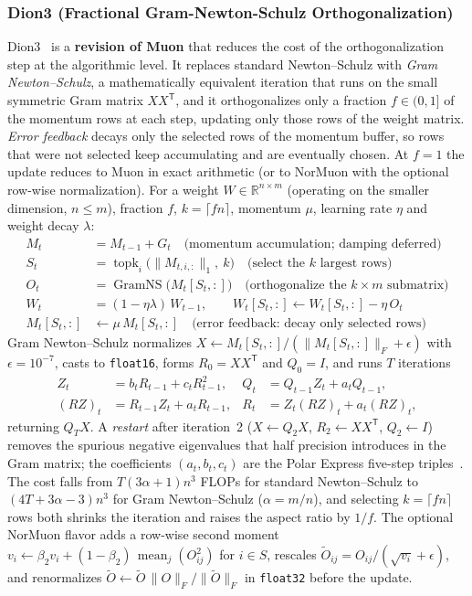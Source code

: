 \subsubsection{Dion3 (Fractional Gram-Newton-Schulz Orthogonalization)}
Dion3~\citep{amsel_dion3_2026} is a \textbf{revision of Muon} that reduces the cost of the orthogonalization step at the algorithmic level. It replaces standard Newton--Schulz with \emph{Gram Newton--Schulz}, a mathematically equivalent iteration that runs on the small symmetric Gram matrix $XX^{\mathsf T}$, and it orthogonalizes only a fraction $f \in (0,1]$ of the momentum rows at each step, updating only those rows of the weight matrix. \emph{Error feedback} decays only the selected rows of the momentum buffer, so rows that were not selected keep accumulating and are eventually chosen. At $f = 1$ the update reduces to Muon in exact arithmetic (or to NorMuon with the optional row-wise normalization). For a weight $W \in \mathbb{R}^{n \times m}$ (operating on the smaller dimension, $n \le m$), fraction $f$, $k = \lceil f n \rceil$, momentum $\mu$, learning rate $\eta$ and weight decay $\lambda$:
\begin{align}
M_t &= M_{t-1} + G_t \quad\text{(momentum accumulation; damping deferred)} \\
S_t &= \operatorname{topk}_{i}\bigl(\lVert M_{t,i,:}\rVert_1,\ k\bigr) \quad\text{(select the } k \text{ largest rows)} \\
O_t &= \operatorname{GramNS}\bigl(M_t[S_t,:]\bigr) \quad\text{(orthogonalize the } k \times m \text{ submatrix)} \\
W_t &= (1 - \eta\lambda)\, W_{t-1}, \qquad W_t[S_t,:] \gets W_t[S_t,:] - \eta\, O_t \\
M_t[S_t,:] &\gets \mu\, M_t[S_t,:] \quad\text{(error feedback: decay only selected rows)}
\end{align}
Gram Newton--Schulz normalizes $X \gets M_t[S_t,:]/(\lVert M_t[S_t,:]\rVert_F + \epsilon)$ with $\epsilon = 10^{-7}$, casts to \texttt{float16}, forms $R_0 = X X^{\mathsf T}$ and $Q_0 = I$, and runs $T$ iterations
\begin{align}
Z_t &= b_t R_{t-1} + c_t R_{t-1}^2, &
Q_t &= Q_{t-1} Z_t + a_t Q_{t-1}, \\
(RZ)_t &= R_{t-1} Z_t + a_t R_{t-1}, &
R_t &= Z_t (RZ)_t + a_t (RZ)_t,
\end{align}
returning $Q_T X$. A \emph{restart} after iteration~2 ($X \gets Q_2 X$, $R_2 \gets X X^{\mathsf T}$, $Q_2 \gets I$) removes the spurious negative eigenvalues that half precision introduces in the Gram matrix; the coefficients $(a_t,b_t,c_t)$ are the Polar Express five-step triples~\citep{amsel_polar_express_2026}. The cost falls from $T(3\alpha+1)n^3$ FLOPs for standard Newton--Schulz to $(4T+3\alpha-3)n^3$ for Gram Newton--Schulz ($\alpha = m/n$), and selecting $k = \lceil f n \rceil$ rows both shrinks the iteration and raises the aspect ratio by $1/f$. The optional NorMuon flavor adds a row-wise second moment $v_i \gets \beta_2 v_i + (1-\beta_2)\,\operatorname{mean}_j(O_{ij}^2)$ for $i \in S$, rescales $\tilde O_{ij} = O_{ij}/(\sqrt{v_i}+\epsilon)$, and renormalizes $\tilde O \gets \tilde O\,\lVert O\rVert_F/\lVert\tilde O\rVert_F$ in \texttt{float32} before the update.

